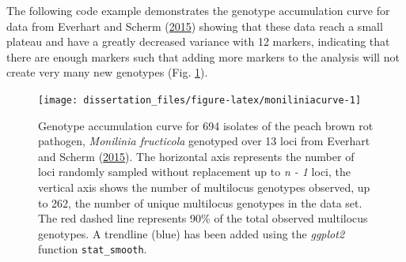 \documentclass[double,12pt]{beavtex}
\begin{document}
  The following code example demonstrates the genotype accumulation curve
  for data from Everhart and Scherm
  (\protect\hyperlink{ref-everhart2014fine}{2015}) showing that these data
  reach a small plateau and have a greatly decreased variance with 12
  markers, indicating that there are enough markers such that adding more
  markers to the analysis will not create very many new genotypes (Fig.
  \ref{fig:moniliniacurve}).
  
  \begin{Shaded}
  \begin{Highlighting}[]
  \NormalTok{(}\NormalTok{);}
  \NormalTok{(}\NormalTok{);}
  \NormalTok{(}\NormalTok{, } \NormalTok{);}
  
  \NormalTok{(}\NormalTok{);}
   \NormalTok{);}
  \StringTok{ }\NormalTok{() +}\StringTok{ }\NormalTok{();   }
  \StringTok{ }\NormalTok{(}\NormalTok{(} \NormalTok{)); }
  \end{Highlighting}
  \end{Shaded}
  
  \begin{figure}
  
  {\centering \texttt{[image: dissertation\_files/figure-latex/moniliniacurve-1]} 
  
  }
  
  \caption[Genotype accumulation curve]{Genotype accumulation curve for 694 isolates of the peach brown rot
  pathogen, \emph{Monilinia fructicola} genotyped over 13 loci from
  Everhart and Scherm (\protect\hyperlink{ref-everhart2014fine}{2015}).
  The horizontal axis represents the number of loci randomly sampled
  without replacement up to \emph{n - 1} loci, the vertical axis shows the
  number of multilocus genotypes observed, up to 262, the number of unique
  multilocus genotypes in the data set. The red dashed line represents
  90\% of the total observed multilocus genotypes. A trendline (blue) has
  been added using the \emph{ggplot2} function \texttt{stat\_smooth}.}\label{fig:moniliniacurve}
  \end{figure}
  
\end{document}

